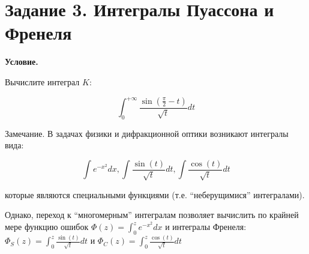 \section{Задание 3. Интегралы Пуассона и Френеля}

\textbf{Условие.}

Вычислите интеграл $K$:

\[\int_0^{+\infty} \frac{\sin\left(\frac{\pi}{2} - t\right)}{\sqrt{t}} dt\]

Замечание. В задачах физики и дифракционной оптики возникают интегралы вида:

\[\int e^{-x^2} dx, \int \frac{\sin(t)}{\sqrt{t}} dt, \int \frac{\cos(t)}{\sqrt{t}} dt\]

которые являются специальными функциями (т.е. \enquote{неберущимися} интегралами).

Однако, переход к \enquote{многомерным} интегралам позволяет вычислить по крайней мере функцию ошибок
$\Phi(z) = \int_0^z e^{-x^2} dx$ и интегралы Френеля: $\Phi_S(z) = \int_0^z \frac{\sin(t)}{\sqrt{t}} dt$ и $\Phi_C(z) = \int_0^z \frac{\cos(t)}{\sqrt{t}} dt$

